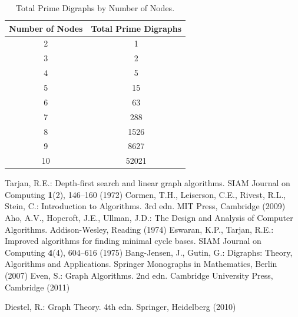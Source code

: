 \documentclass[runningheads]{llncs}
\begin{document}
\begin{table}
\caption{Total Prime Digraphs by Number of Nodes.}\label{tab1}
\centering
\begin{tabular}{|c|c|}
\hline
Number of Nodes & Total Prime Digraphs \\
\hline
2 & 1 \\
3 & 2 \\
4 & 5 \\
5 & 15 \\
6 & 63 \\
7 & 288 \\
8 & 1526 \\
9 & 8627 \\
10 & 52021 \\
\hline
\end{tabular}
\end{table}


\begin{thebibliography}{8}
Tarjan, R.E.: Depth-first search and linear graph algorithms. SIAM Journal on Computing \textbf{1}(2), 146--160 (1972)
Cormen, T.H., Leiserson, C.E., Rivest, R.L., Stein, C.: Introduction to Algorithms. 3rd edn. MIT Press, Cambridge (2009)
Aho, A.V., Hopcroft, J.E., Ullman, J.D.: The Design and Analysis of Computer Algorithms. Addison-Wesley, Reading (1974)
Eswaran, K.P., Tarjan, R.E.: Improved algorithms for finding minimal cycle bases. SIAM Journal on Computing \textbf{4}(4), 604--616 (1975)
Bang-Jensen, J., Gutin, G.: Digraphs: Theory, Algorithms and Applications. Springer Monographs in Mathematics, Berlin (2007)
Even, S.: Graph Algorithms. 2nd edn. Cambridge University Press, Cambridge (2011)

Diestel, R.: Graph Theory. 4th edn. Springer, Heidelberg (2010)
\end{thebibliography}
\end{document}
